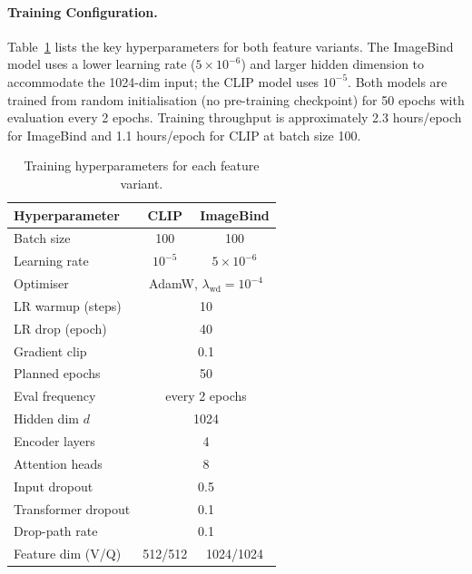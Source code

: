 \documentclass[10pt,twocolumn]{article}
\begin{document}
\paragraph{Training Configuration.}
Table~\ref{tab:hyperparam} lists the key hyperparameters for both feature
variants. The ImageBind model uses a lower learning rate ($5\!\times\!10^{-6}$)
and larger hidden dimension to accommodate the 1024-dim input; the CLIP model
uses $10^{-5}$. Both models are trained from random initialisation (no
pre-training checkpoint) for 50 epochs with evaluation every 2 epochs.
Training throughput is approximately 2.3 hours/epoch for ImageBind and
1.1 hours/epoch for CLIP at batch size 100.

\begin{table}[h]
  \centering
  \small
  \caption{Training hyperparameters for each feature variant.}
  \label{tab:hyperparam}
  \begin{tabular}{lcc}
    \toprule
    Hyperparameter & CLIP & ImageBind \\
    \midrule
    Batch size            & 100  & 100  \\
    Learning rate         & $10^{-5}$ & $5\!\times\!10^{-6}$ \\
    Optimiser             & \multicolumn{2}{c}{AdamW, $\lambda_{\text{wd}}=10^{-4}$} \\
    LR warmup (steps)     & \multicolumn{2}{c}{10} \\
    LR drop (epoch)       & \multicolumn{2}{c}{40} \\
    Gradient clip         & \multicolumn{2}{c}{0.1} \\
    Planned epochs        & \multicolumn{2}{c}{50} \\
    Eval frequency        & \multicolumn{2}{c}{every 2 epochs} \\
    Hidden dim $d$        & \multicolumn{2}{c}{1024} \\
    Encoder layers        & \multicolumn{2}{c}{4} \\
    Attention heads       & \multicolumn{2}{c}{8} \\
    Input dropout         & \multicolumn{2}{c}{0.5} \\
    Transformer dropout   & \multicolumn{2}{c}{0.1} \\
    Drop-path rate        & \multicolumn{2}{c}{0.1} \\
    Feature dim (V/Q)     & 512/512 & 1024/1024 \\
    \bottomrule
  \end{tabular}
\end{table}
\end{document}

